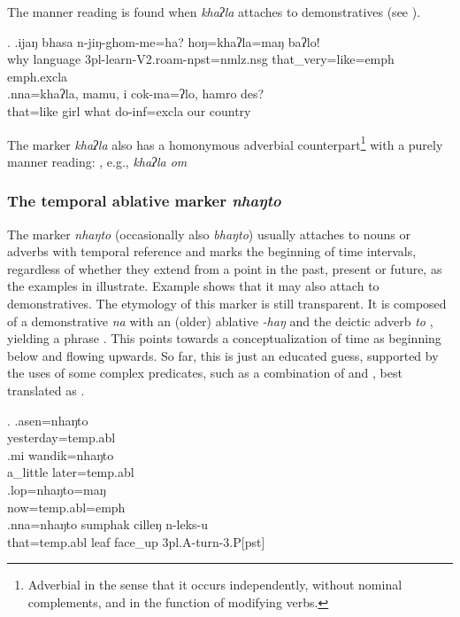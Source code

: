The manner reading is found when \emph{khaʔla}  attaches to demonstratives (see \Next).

\ex. \ag.ijaŋ bhasa    n-jiŋ-ghom-me=ha?                        hoŋ=khaʔla=maŋ baʔlo!\\
why language {\sc 3pl-}learn{\sc -V2.roam-npst=nmlz.nsg} that\_very=like{\sc =emph} {\sc emph.excla}\\
 
\bg.nna=khaʔla, mamu, i    cok-ma=ʔlo,               hamro des?\\
that=like girl what do{\sc -inf=excla} our country\\
 

The marker \emph{khaʔla} also has a homonymous adverbial counterpart\footnote{Adverbial in the sense that it occurs independently, without nominal complements, and in the function of  modifying verbs.} with a purely manner reading: , e.g.,  \emph{khaʔla om}  

\subsubsection{The temporal ablative marker \emph{nhaŋto} }
   
   The marker \emph{nhaŋto} (occasionally also \emph{bhaŋto}) usually attaches to nouns or adverbs with temporal reference and marks the beginning of time intervals, regardless of whether they extend from a point in the past, present or future, as the examples in \Next illustrate. Example \Next[d] shows that it may also attach to  demonstratives. The etymology of this marker is still transparent. It is composed of a demonstrative \emph{na} with an (older) ablative \emph{-haŋ} and the deictic adverb \emph{to} , yielding a phrase . This points towards a conceptualization of time as beginning below and flowing upwards. So  far, this is just an educated guess, supported by the uses of some complex predicates, such as a combination of  and , best translated as .
 
 \ex. \ag.asen=nhaŋto\\
 yesterday{\sc =temp.abl}\\
 \bg.mi wandik=nhaŋto\\
 a\_little later{\sc =temp.abl}\\
   \bg.lop=nhaŋto=maŋ\\
   now{\sc =temp.abl=emph}\\
\bg.nna=nhaŋto sumphak cilleŋ              n-leks-u\\
that{\sc =temp.abl} leaf face\_up {\sc 3pl.A-}turn{\sc -3.P[pst]}\\
  


